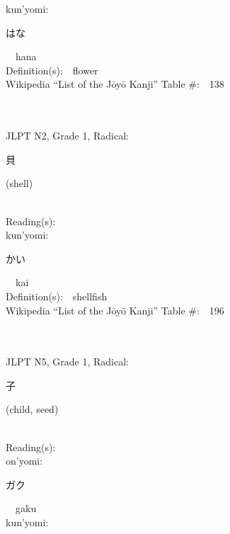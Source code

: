 \begin{multicols}{2}
{\hspace*{1em}}kun'yomi:\ \ \\
{\hspace*{2em}}{\begin{CJK}{UTF8}{min} はな \end{CJK}}\ \ hana\ \ \\
Definition(s):\ \ flower \\
Wikipedia ``List of the J\=oy\=o Kanji'' Table \#:\ \ 138 \\
\ \ \\
{\fontsize{34pt}{40pt}  }\ \ \\  %
{JLPT N2, Grade 1, Radical:\ \ {\begin{CJK}{UTF8}{min} 貝 \end{CJK}} (shell) } \\
Reading(s):\ \ \\
{\hspace*{1em}}kun'yomi:\ \ \\
{\hspace*{2em}}{\begin{CJK}{UTF8}{min} かい \end{CJK}}\ \ kai\ \ \\
Definition(s):\ \ shellfish \\
Wikipedia ``List of the J\=oy\=o Kanji'' Table \#:\ \ 196 \\
\ \ \\
{\fontsize{34pt}{40pt}  }\ \ \\  %
{JLPT N5, Grade 1, Radical:\ \ {\begin{CJK}{UTF8}{min} 子 \end{CJK}} (child, seed) } \\
Reading(s):\ \ \\
{\hspace*{1em}}on'yomi:\ \ \\
{\hspace*{2em}}{\begin{CJK}{UTF8}{min} ガク \end{CJK}}\ \ gaku\ \ \\
{\hspace*{1em}}kun'yomi:\ \ \\

\end{multicols}
